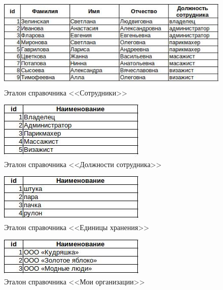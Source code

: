 \begin{figure}[!h]
    \centering

    \includegraphics[]
    {assets/etalons/CPR_Sotrudniki.jpg}

    \caption{Эталон справочника <<Сотрудники>>}

    \label{fig:CPR_Sotrudniki}
\end{figure}

\begin{figure}[!h]
    \centering

    \includegraphics[]
    {assets/etalons/CPR_DolzhnostiSotrudnika.jpg}

    \caption{Эталон справочника <<Должности сотрудника>>}

    \label{fig:CPR_DolzhnostiSotrudnika}

\end{figure}

\begin{figure}[!h]
    \centering

    \includegraphics[]
    {assets/etalons/CPR_EdinicyHraneniay.jpg}

    \caption{Эталон справочника <<Единицы хранения>>}

    \label{fig:CPR_EdinicyHraneniay}
\end{figure}

\begin{figure}[!h]
    \centering

    \includegraphics[]
    {assets/etalons/CPR_MoiOrganizacii.jpg}

    \caption{Эталон справочника <<Мои организации>>}

    \label{fig:CPR_MoiOrganizacii}
\end{figure}


